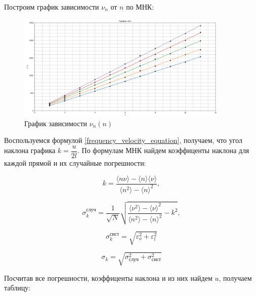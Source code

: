 \documentclass[a4paper,12pt]{article}
\begin{document}
	Построим график зависимости $\nu_n$ от $n$ по МНК:
	
	\begin{figure}[h!]
		\begin{center}
			\includegraphics[width = 0.9\textwidth]{1.4.5 graph}
			\caption{График зависимости $\nu_n (n)$}
		\end{center}
	\end{figure}
	
	Воспользуемся формулой \eqref{frequency_velocity_equation}, получаем, что угол наклона графика $k = \dfrac{u}{2l}$. По формулам МНК найдем коэффиценты наклона для каждой прямой и их случайные погрешности:
	
	\begin{equation}
		k=\frac{\langle n\nu\rangle-\langle n\rangle \langle \nu\rangle}{\langle n^2\rangle - \langle n\rangle^2},
	\end{equation}

	\begin{equation}
		\sigma_k^\text{случ}=\frac{1}{\sqrt{N}}\sqrt{\frac{\langle \nu^2 \rangle - \langle \nu \rangle^2}{\langle n^2 \rangle - \langle n \rangle^2} - k^2  },
	\end{equation}
	
	\begin{equation}
		\sigma_k^{\text{сист}} = \sqrt{ \varepsilon_\nu^2 + \varepsilon_l^2 }
	\end{equation}

	\begin{equation}
		\sigma_k = \sqrt{\sigma_\text{случ}^2 + \sigma_\text{сист}^2}
	\end{equation}

	Посчитав все погрешности, коэффиценты наклона и из них найдем $u$, получаем таблицу:
	
\end{document}
